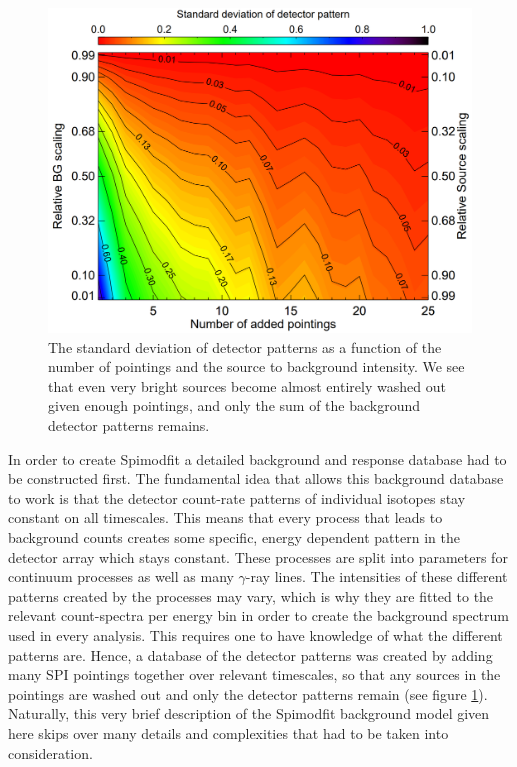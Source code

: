 \documentclass{report}
\begin{document}
\begin{figure}
  \includegraphics[width=\linewidth]{Images/General/SMF_background_pattern_siegert_2019.PNG}
  \caption{The standard deviation of detector patterns as a function of the number of pointings and the source to background intensity. We see that even very bright sources become almost entirely washed out given enough pointings, and only the sum of the background detector patterns remains. \cite{refId1}}
  \vspace{-0pt}
  \label{smf_background_model_idea}
  \vspace{-35pt}
\end{figure}

In order to create Spimodfit a detailed background and response database had to be constructed first. The fundamental idea that allows this background database to work is that the detector count-rate patterns of individual isotopes stay constant on all timescales. This means that every process that leads to background counts creates some specific, energy dependent pattern in the detector array which stays constant. These processes are split into parameters for continuum processes as well as many $\gamma$-ray lines. The intensities of these different patterns created by the processes may vary, which is why they are fitted to the relevant count-spectra per energy bin in order to create the background spectrum used in every analysis. This requires one to have knowledge of what the different patterns are. Hence, a database of the detector patterns was created by adding many SPI pointings together over relevant timescales, so that any sources in the pointings are washed out and only the detector patterns remain (see figure \ref{smf_background_model_idea}). Naturally, this very brief description of the Spimodfit background model given here skips over many details and complexities that had to be taken into consideration.
\end{document}
